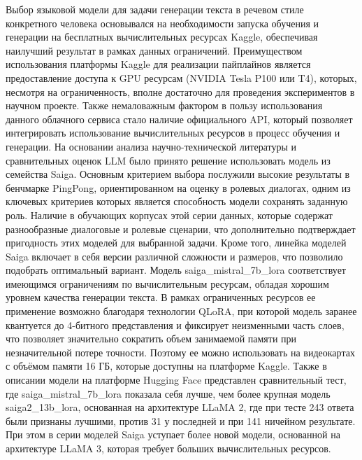 Выбор языковой модели для задачи генерации текста в речевом стиле конкретного человека основывался на необходимости запуска обучения и генерации на бесплатных вычислительных ресурсах Kaggle, обеспечивая наилучший результат в рамках данных ограничений. Преимуществом использования платформы Kaggle для реализации пайплайнов является предоставление доступа к GPU ресурсам (NVIDIA Tesla P100 или T4), которых, несмотря на ограниченность, вполне достаточно для проведения экспериментов в научном проекте. Также немаловажным фактором в пользу использования данного облачного сервиса стало наличие официального API, который позволяет интегрировать использование вычислительных ресурсов в процесс обучения и генерации. 
На основании анализа научно-технической литературы и сравнительных оценок LLM было принято решение использовать модель из семейства Saiga. Основным критерием выбора послужили высокие результаты в бенчмарке PingPong, ориентированном на оценку в ролевых диалогах, одним из ключевых критериев которых является способность модели сохранять заданную роль. Наличие в обучающих корпусах этой серии данных, которые содержат разнообразные диалоговые и ролевые сценарии, что дополнительно подтверждает пригодность этих моделей для выбранной задачи.
Кроме того, линейка моделей Saiga включает в себя версии различной сложности и размеров, что позволило подобрать оптимальный вариант. Модель saiga\_mistral\_7b\_lora соответствует имеющимся ограничениям по вычислительным ресурсам, обладая хорошим уровнем качества генерации текста.
В рамках ограниченных ресурсов ее применение возможно благодаря технологии QLoRA, при которой модель заранее квантуется до 4-битного представления и фиксирует неизменными часть слоев, что позволяет значительно сократить объем занимаемой памяти при незначительной потере точности. Поэтому ее можно использовать на видеокартах с объёмом памяти 16 ГБ, которые доступны на платформе Kaggle.
Также в описании модели на платформе Hugging Face представлен сравнительный тест, где saiga\_mistral\_7b\_lora показала себя лучше, чем более крупная модель saiga2\_13b\_lora, основанная на архитектуре LLaMA 2, где при тесте 243 ответа были признаны лучшими, против 31 у последней и при 141 ничейном результате. При этом в серии моделей Saiga уступает более новой модели, основанной на архитектуре LLaMA 3, которая требует больших вычислительных ресурсов.


